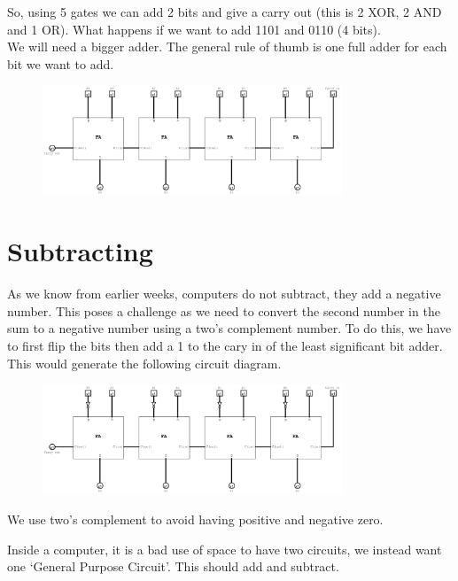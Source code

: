 So, using 5 gates we can add 2 bits and give a carry out (this is 2 XOR, 2 AND and 1 OR). What happens if we want to add 1101 and 0110 (4 bits).\\
We will need a bigger adder. The general rule of thumb is one full adder for each bit we want to add.
\begin{figure}[H]
    \centering
    \includegraphics[width=0.8\textwidth]{assets/full-adder-4-bit.png}
\end{figure}

\section*{Subtracting}
As we know from earlier weeks, computers do not subtract, they add a negative number. This poses a challenge as we need to convert the second number in the sum to a negative number using a two's complement number. To do this, we have to first flip the bits then add a 1 to the cary in of the least significant bit adder. This would generate the following circuit diagram.
\begin{figure}[H]
    \centering
    \includegraphics[width=0.8\textwidth]{assets/subtractor.png}
\end{figure}

We use two's complement to avoid having positive and negative zero.

Inside a computer, it is a bad use of space to have two circuits, we instead want one `General Purpose Circuit'. This should add and subtract.

